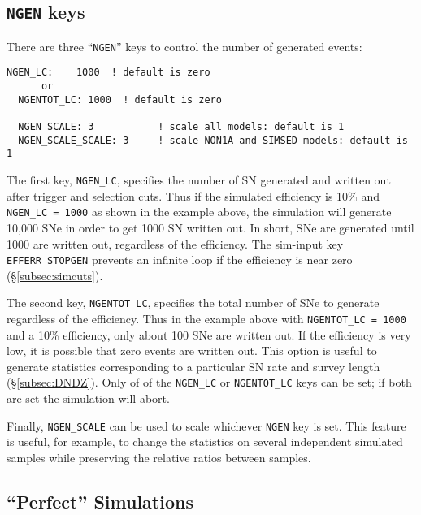 \documentclass[12pt]{article}
\begin{document}
\clearpage
   \subsection{{\tt NGEN} keys}
   \label{subsec:NGEN}

There are three ``{\tt NGEN}'' keys to control the number
of generated events:

\begin{Verbatim}[frame=single]
  NGEN_LC:    1000  ! default is zero
      or
  NGENTOT_LC: 1000  ! default is zero

  NGEN_SCALE: 3           ! scale all models: default is 1
  NGEN_SCALE_SCALE: 3     ! scale NON1A and SIMSED models: default is 1
\end{Verbatim}
%
The first key, {\tt NGEN\_LC}, specifies the number of SN generated
and written out after trigger and selection cuts. Thus if the simulated
efficiency is 10\% and {\tt NGEN\_LC = 1000} as shown in the example
above, the simulation will generate 10,000 SNe in order to get 1000
SN written out. In short, SNe are generated until 1000 are written out,
regardless of the efficiency.
The sim-input key {\tt EFFERR\_STOPGEN} prevents an infinite 
loop if the efficiency is near zero (\S\ref{subsec:simcuts}).
   

The second key, {\tt NGENTOT\_LC}, specifies the total number of SNe
to generate regardless of the efficiency. Thus in the example above
with {\tt NGENTOT\_LC = 1000} and a 10\% efficiency, only about 
100 SNe are written out. If the efficiency is very low, it is possible
that zero events are written out.  This option is useful to generate
statistics corresponding to a particular SN rate and survey length
(\S\ref{subsec:DNDZ}).
Only of of the {\tt NGEN\_LC} or {\tt NGENTOT\_LC} keys can be set;
if both are set the simulation will abort.

Finally, {\tt NGEN\_SCALE} can be used to scale whichever {\tt NGEN} 
key is set. This feature is useful, for example, to change
the statistics on several independent simulated samples while 
preserving the relative ratios between samples.


   \subsection{``Perfect'' Simulations}
   \label{subsec:sim_perfect}
\end{document}
